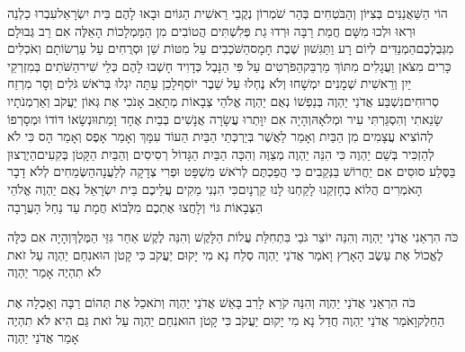 \documentclass[../main/main.tex]{subfiles}
\begin{document}
\begin{multicols*}{\ncols}
הוֹי הַשַּׁאֲנַנִּים בְּצִיּוֹן וְהַבֹּטְחִים בְּהַר שֹׁמְרוֹן נְקֻבֵי רֵאשִׁית הַגּוֹיִם וּבָאוּ לָהֶם בֵּית יִשְׂרָאֵל\PreVerseSpace{}עִבְרוּ כַלְנֵה וּרְאוּ וּלְכוּ מִשָּׁם חֲמַת רַבָּה וּרְדוּ גַת פְּלִשְׁתִּים הֲטוֹבִים מִן הַמַּמְלָכוֹת הָאֵלֶּה אִם רַב גְּבוּלָם מִגְּבֻלְכֶם\PreVerseSpace{}הַמְנַדִּים לְיוֹם רָע וַתַּגִּשׁוּן שֶׁבֶת חָמָס\PreVerseSpace{}הַשֹּׁכְבִים עַל מִטּוֹת שֵׁן וּסְרֻחִים עַל עַרְשׂוֹתָם וְאֹכְלִים כָּרִים מִצֹּאן וַעֲגָלִים מִתּוֹךְ מַרְבֵּק\PreVerseSpace{}הַפֹּרְטִים עַל פִּי הַנָּבֶל כְּדָוִיד חָשְׁבוּ לָהֶם כְּלֵי שִׁיר\PreVerseSpace{}הַשֹּׁתִים בְּמִזְרְקֵי יַיִן וְרֵאשִׁית שְׁמָנִים יִמְשָׁחוּ וְלֹא נֶחְלוּ עַל שֵׁבֶר יוֹסֵף\PreVerseSpace{}לָכֵן עַתָּה יִגְלוּ בְּרֹאשׁ גֹּלִים וְסָר מִרְזַח סְרוּחִים\PreVerseSpace{}נִשְׁבַּע אֲדֹנַי יַהְוֶה בְּנַפְשׁוֹ נְאֻם יַהְוֶה אֱלֹהֵי צְבָאוֹת מְתָאֵב אָנֹכִי אֶת גְּאוֹן יַעֲקֹב וְאַרְמְנֹתָיו שָׂנֵאתִי וְהִסְגַּרְתִּי עִיר וּמְלֹאָהּ\PreVerseSpace{}וְהָיָה אִם יִוָּתְרוּ עֲשָׂרָה אֲנָשִׁים בְּבַיִת אֶחָד וָמֵתוּ\PreVerseSpace{}וּנְשָׂאוֹ דּוֹדוֹ וּמְסָרְפוֹ לְהוֹצִיא עֲצָמִים מִן הַבַּיִת וְאָמַר לַאֲשֶׁר בְּיַרְכְּתֵי הַבַּיִת הַעוֹד עִמָּךְ וְאָמַר אָפֶס וְאָמַר הָס כִּי לֹא לְהַזְכִּיר בְּשֵׁם יַהְוֶה \ClosedSection{}כִּי הִנֵּה יַהְוֶה מְצַוֶּה וְהִכָּה הַבַּיִת הַגָּדוֹל רְסִיסִים וְהַבַּיִת הַקָּטֹן בְּקִעִים\PreVerseSpace{}הַיְרֻצוּן בַּסֶּלַע סוּסִים אִם יַחֲרוֹשׁ בַּנְּקֵבִים\SubEnd{} כִּי הֲפַכְתֶּם לְרֹאשׁ מִשְׁפָּט וּפְרִי צְדָקָה לְלַעֲנָה\PreVerseSpace{}הַשְּׂמֵחִים לְלֹא דָבָר הָאֹמְרִים הֲלוֹא בְחָזְקֵנוּ לָקַחְנוּ לָנוּ קַרְנָיִם\PreVerseSpace{}כִּי הִנְנִי מֵקִים עֲלֵיכֶם בֵּית יִשְׂרָאֵל נְאֻם יַהְוֶה אֱלֹהֵי הַצְּבָאוֹת גּוֹי וְלָחֲצוּ אֶתְכֶם מִלְּבוֹא חֲמָת עַד נַחַל הָעֲרָבָה\OpenSection{}\par
{}כֹּה הִרְאַנִי אֲדֹנַי יַהְוֶה וְהִנֵּה יוֹצֵר גֹּבַי בִּתְחִלַּת עֲלוֹת הַלָּקֶשׁ וְהִנֵּה לֶקֶשׁ אַחַר גִּזֵּי הַמֶּלֶךְ\PreVerseSpace{}וְהָיָה אִם כִּלָּה לֶאֱכוֹל אֶת עֵשֶׂב הָאָרֶץ וָאֹמַר אֲדֹנַי יַהְוֶה סְלַח נָא מִי יָקוּם יַעֲקֹב כִּי קָטֹן הוּא\PreVerseSpace{}נִחַם יַהְוֶה עַל זֹאת לֹא תִהְיֶה אָמַר יַהְוֶה\OpenSection{}\par
{}כֹּה הִרְאַנִי אֲדֹנַי יַהְוֶה וְהִנֵּה קֹרֵא לָרִב בָּאֵשׁ אֲדֹנַי יַהְוֶה וְתֹאכֵל\SubEnd{} אֶת תְּהוֹם רַבָּה וְאָכְלָה אֶת הַחֵלֶק\PreVerseSpace{}וָאֹמַר אֲדֹנַי יַהְוֶה חֲדַל נָא מִי יָקוּם יַעֲקֹב כִּי קָטֹן הוּא\PreVerseSpace{}נִחַם יַהְוֶה עַל זֹאת גַּם הִיא לֹא תִהְיֶה אָמַר אֲדֹנַי יַהְוֶה\OpenSection{}\par

\end{multicols*}
\end{document}
